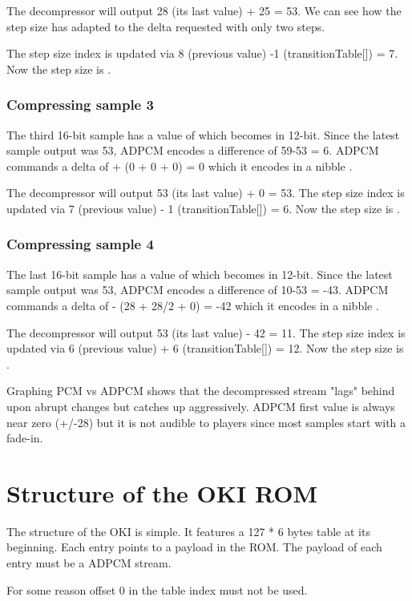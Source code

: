 The decompressor will output 28 (its last value) + 25 = 53. We can see how the step size has adapted to the delta requested with only two steps. 

The step size index is updated via 8 (previous value) -1 (transitionTable[]) = 7. Now the step size is .

\subsubsection{Compressing sample 3}
The third 16-bit sample has a value of  which becomes  in 12-bit. Since the latest sample output was 53, ADPCM encodes a difference of 59-53 = 6. ADPCM commands a delta of + (0 + 0 + 0) = 0 which it encodes in a nibble . 

The decompressor will output 53 (its last value) + 0 = 53. The step size index is updated via 7 (previous value) - 1  (transitionTable[]) = 6. Now the step size is .

\subsubsection{Compressing sample 4}
The last 16-bit sample has a value of  which becomes  in 12-bit. Since the latest sample output was 53, ADPCM encodes a difference of 10-53 = -43. ADPCM commands a delta of - (28 + 28/2 + 0) = -42 which it encodes in a nibble . 

The decompressor will output 53 (its last value) - 42 = 11. The step size index is updated via 6 (previous value) + 6 (transitionTable[]) = 12. Now the step size is .

Graphing PCM vs ADPCM shows that the decompressed stream "lags" behind upon abrupt changes but catches up aggressively. ADPCM first value is always near zero (+/-28) but it is not audible to players since most samples start with a fade-in. 


\section{Structure of the OKI ROM}
The structure of the OKI is simple. It features a 127 * 6 bytes table at its beginning. Each entry points to a payload in the ROM. The payload of each entry must be a ADPCM stream.

For some reason offset 0 in the table index must not be used.

